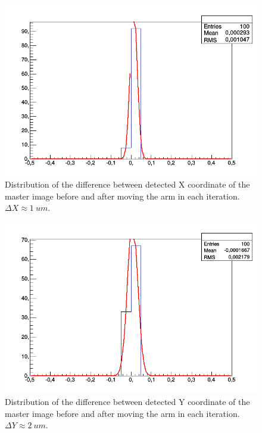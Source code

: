 \begin{figure}[ht]\centering
\includegraphics[width=0.8\linewidth]{Data/Precision_tests/Corner_c_x.png}
\caption{Distribution of the difference between detected X coordinate of the master image before and after moving the arm in each iteration. $\Delta X \approx 1~um$. }
\label{fig:corner_x}
\end{figure}

\begin{figure}[ht]\centering
\includegraphics[width=0.8\linewidth]{Data/Precision_tests/Corner_c_y.png}
\caption{Distribution of the difference between detected Y coordinate of the master image before and after moving the arm in each iteration. $\Delta Y \approx 2~um$.}
\label{fig:corner_y}
\end{figure}

